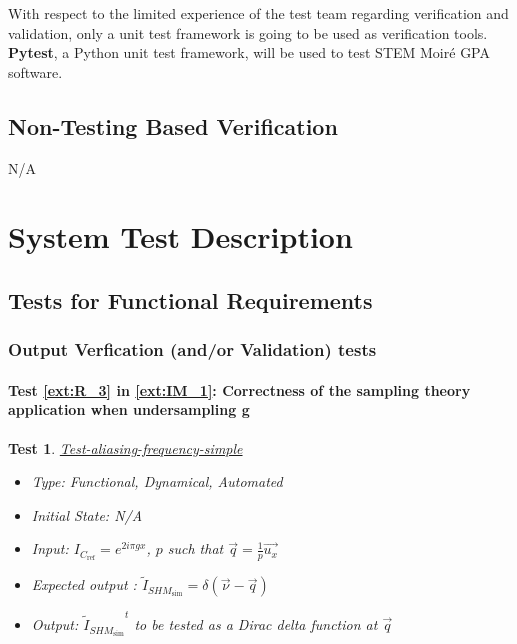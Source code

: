 \documentclass[12pt, titlepage]{article}
\newcommand{\progname}{STEM Moir{\'e} GPA}
\newtheorem{Test}{Test}
\begin{document}
With respect to the limited experience of the test team regarding verification and validation, only a unit test framework is going to be used as verification tools. \textbf{Pytest}, a Python unit test framework, will be used to test \progname{} software.

\subsection{Non-Testing Based Verification}

N/A  

\section{System Test Description}
	
\subsection{Tests for Functional Requirements}
\renewcommand{\labelitemi}{$\star$}

\subsubsection{Output Verfication (and/or Validation) tests}
	
\paragraph{Test \cref{ext:R_3} in \cref{ext:IM_1}: Correctness of the sampling theory application when undersampling g}

\begin{Test}\normalfont\underline{Test-aliasing-frequency-simple}
\label{aliasing-frequency-simple}
\begin{itemize}
\item Type: Functional, Dynamical, Automated
\item Initial State: N/A
\item Input: $I_{C_{\text{ref}}}=e^{2i\pi gx}$, $p$ such that $\overrightarrow{q}=\frac{1}{p}\vec{u_x}$
\item Expected output : $\widetilde{I}_{\mathit{SHM}_{\text{sim}}}=\delta(\vec{\nu}-\vec{q})$
\item Output: ${\widetilde{I}_{\mathit{SHM}_{\text{sim}}}}^{t}$ to be tested as a Dirac delta function at $\overrightarrow{q}$
\end{itemize}
\end{Test}
		
\end{document}
